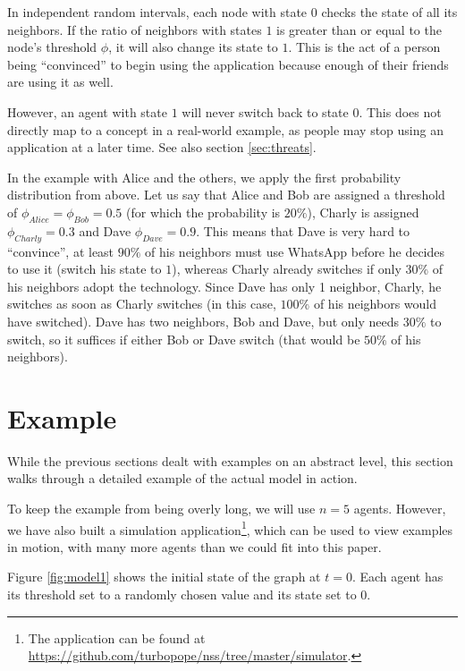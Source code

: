 \documentclass{sig-alternate-05-2015}
\begin{document}
In independent random intervals, each node with state $0$ checks the state of all its neighbors. If the ratio of neighbors with states $1$ is greater than or equal to the node's threshold $\phi$, it will also change its state to $1$. This is the act of a person being ``convinced'' to begin using the application because enough of their friends are using it as well.

However, an agent with state $1$ will never switch back to state $0$. This does not directly map to a concept in a real-world example, as people may stop using an application at a later time. See also section \ref{sec:threats}.

In the example with Alice and the others, we apply the first probability distribution from above. Let us say that Alice and Bob are assigned a threshold of $\phi_{Alice} = \phi_{Bob} = 0.5$ (for which the probability is $20\%$), Charly is assigned $\phi_{Charly} = 0.3$ and Dave $\phi_{Dave} = 0.9$. This means that Dave is very hard to ``convince'', at least $90\%$ of his neighbors must use WhatsApp before he decides to use it (switch his state to $1$), whereas Charly already switches if only $30\%$ of his neighbors adopt the technology. Since Dave has only 1 neighbor, Charly, he switches as soon as Charly switches (in this case, $100\%$ of his neighbors would have switched). Dave has two neighbors, Bob and Dave, but only needs $30\%$ to switch, so it suffices if either Bob or Dave switch (that would be $50\%$ of his neighbors).


\section{Example}\label{sec:example}

While the previous sections dealt with examples on an abstract level, this section walks through a detailed example of the actual model in action.

To keep the example from being overly long, we will use $n = 5$ agents. However, we have also built a simulation application\footnote{The application can be found at \url{https://github.com/turbopope/nss/tree/master/simulator}.}, which can be used to view examples in motion, with many more agents than we could fit into this paper.

Figure \ref{fig:model1} shows the initial state of the graph at $t = 0$. Each agent has its threshold set to a randomly chosen value and its state set to $0$.
\end{document}
